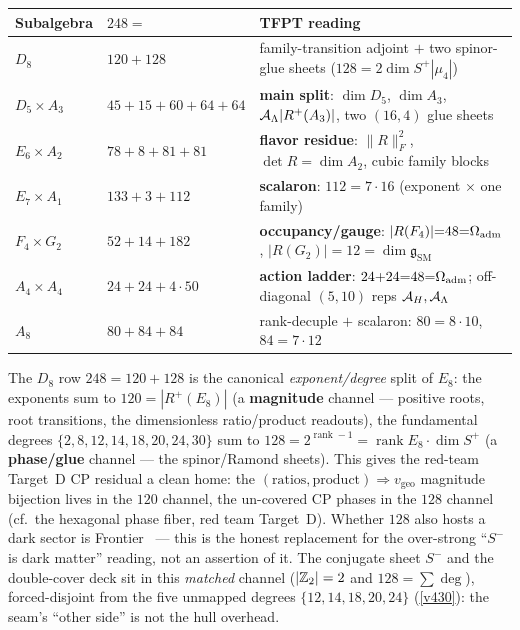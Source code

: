 \begin{center}\small
\renewcommand{\arraystretch}{1.3}
\begin{tabularx}{\linewidth}{@{}p{2.1cm}p{4.1cm}Y@{}}
\toprule
\textbf{Subalgebra} & \textbf{$248=$} & \textbf{TFPT reading} \\
\midrule
$D_8$ & $120+128$ & family-transition adjoint $+$ two spinor-glue sheets ($128{=}2\dim S^+|\mu_4|$) \\
$D_5\times A_3$ & $45+15+60+64+64$ & \textbf{main split}: $\dim D_5$, $\dim A_3$, $\mathcal A_\Lambda|R^+(A_3)|$, two $(16,4)$ glue sheets \\
$E_6\times A_2$ & $78+8+81+81$ & \textbf{flavor residue}: $\|R\|_F^2$, $\det R{=}\dim A_2$, cubic family blocks \\
$E_7\times A_1$ & $133+3+112$ & \textbf{scalaron}: $112{=}7\cdot16$ (exponent $\times$ one family) \\
$F_4\times G_2$ & $52+14+182$ & \textbf{occupancy/gauge}: $|R(F_4)|{=}48{=}\Omega_{\mathrm{adm}}$, $|R(G_2)|{=}12{=}\dim\mathfrak g_{\mathrm{SM}}$ \\
$A_4\times A_4$ & $24+24+4\cdot50$ & \textbf{action ladder}: $24{+}24{=}48{=}\Omega_{\mathrm{adm}}$; off-diagonal $(5,10)$ reps $\mathcal A_H,\mathcal A_\Lambda$ \\
$A_8$ & $80+84+84$ & rank-decuple $+$ scalaron: $80{=}8\cdot10$, $84{=}7\cdot12$ \\
\bottomrule
\end{tabularx}
\end{center}

\begin{keybox}
The $D_8$ row $248=120+128$ is the canonical \emph{exponent/degree} split of $E_8$: the exponents sum to
$120=|R^+(E_8)|$ (a \textbf{magnitude} channel --- positive roots, root transitions, the dimensionless
ratio/product readouts), the fundamental degrees $\{2,8,12,14,18,20,24,30\}$ sum to
$128=2^{\operatorname{rank}-1}=\operatorname{rank}E_8\cdot\dim S^+$ (a \textbf{phase/glue} channel --- the
spinor/Ramond sheets). This gives the red-team Target~D CP residual a clean home: the
$(\text{ratios},\text{product})\Rightarrow v_{\mathrm{geo}}$ magnitude bijection lives in the $120$ channel,
the un-covered CP phases in the $128$ channel (cf.\ the hexagonal phase fiber, red team Target~D). Whether
$128$ also hosts a dark sector is Frontier \mO\ --- this is the honest replacement for the over-strong
``$S^-$ is dark matter'' reading, not an assertion of it. The conjugate sheet $S^-$ and the double-cover
deck sit in this \emph{matched} channel ($|\mathbb{Z}_2|=2$ and $128=\sum\deg$), forced-disjoint from the five
unmapped degrees $\{12,14,18,20,24\}$ (\vref{v430}): the seam's ``other side'' is not the hull overhead.
\end{keybox}

